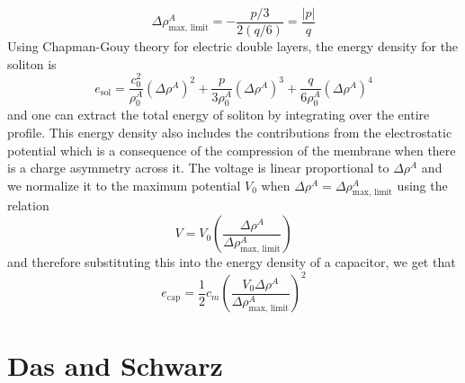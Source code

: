 \documentclass{article}
\numberwithin{equation}{section}
\begin{document}
\begin{equation}
    \Delta \rho^A_{\text{max, limit}} = -\frac{p/3}{2(q/6)} = \frac{|p|}{q}
\end{equation}
Using Chapman-Gouy theory for electric double layers, the energy density for the soliton is 
\begin{equation}
    e_{\text{sol}} = \frac{c_0^2}{\rho_0^A}(\Delta \rho^A)^2 + \frac{p}{3\rho_0^A}(\Delta \rho^A)^3 + \frac{q}{6\rho_0^A}(\Delta \rho^A)^4
\end{equation}
and one can extract the total energy of soliton by integrating over the entire profile. This energy density also includes the contributions from the electrostatic potential which is a consequence of the compression of the membrane when there is a charge asymmetry across it. The voltage is linear proportional to $\Delta \rho^A$ and we normalize it to the maximum potential $V_0$ when $\Delta \rho^A = \Delta \rho^A_{\text{max, limit}}$ using the relation 
\begin{equation*}
    V = V_0\left( \frac{\Delta \rho^A}{\Delta \rho^A_{\text{max, limit}}} \right)
\end{equation*}
and therefore substituting this into the energy density of a capacitor, we get that 
\begin{equation}
    e_{\text{cap}} =\frac{1}{2}c_m\left(\frac{V_0\Delta \rho^A}{\Delta \rho^A_{\text{max, limit}}} \right)^2
\end{equation}

\newpage



\section{Das and Schwarz}
\end{document}

